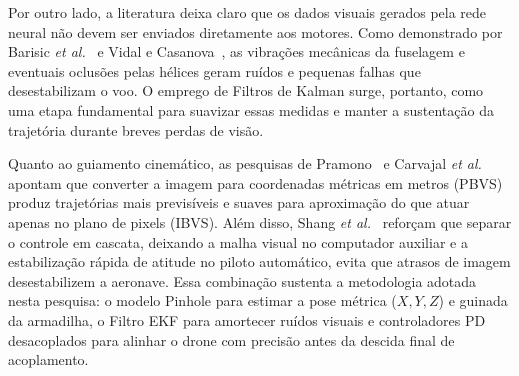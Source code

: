 Por outro lado, a literatura deixa claro que os dados visuais gerados pela rede neural não devem ser enviados diretamente aos motores. Como demonstrado por Barisic \textit{et al.}~\cite{barisic2019} e Vidal e Casanova~\cite{vidal2007}, as vibrações mecânicas da fuselagem e eventuais oclusões pelas hélices geram ruídos e pequenas falhas que desestabilizam o voo. O emprego de Filtros de Kalman surge, portanto, como uma etapa fundamental para suavizar essas medidas e manter a sustentação da trajetória durante breves perdas de visão.

Quanto ao guiamento cinemático, as pesquisas de Pramono~\cite{pramono2025} e Carvajal \textit{et al.}~\cite{carvajal2024} apontam que converter a imagem para coordenadas métricas em metros (PBVS) produz trajetórias mais previsíveis e suaves para aproximação do que atuar apenas no plano de pixels (IBVS). Além disso, Shang \textit{et al.}~\cite{shang2016} reforçam que separar o controle em cascata, deixando a malha visual no computador auxiliar e a estabilização rápida de atitude no piloto automático, evita que atrasos de imagem desestabilizem a aeronave. Essa combinação sustenta a metodologia adotada nesta pesquisa: o modelo Pinhole para estimar a pose métrica ($X, Y, Z$) e guinada da armadilha, o Filtro EKF para amortecer ruídos visuais e controladores PD desacoplados para alinhar o drone com precisão antes da descida final de acoplamento.
